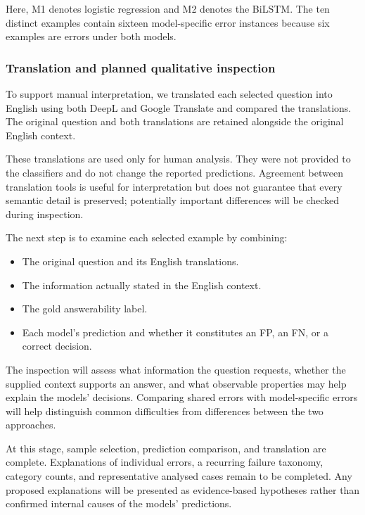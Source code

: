 \documentclass[11pt,a4paper]{article}
\begin{document}
Here, M1 denotes logistic regression and M2 denotes the BiLSTM.
The ten distinct examples contain sixteen model-specific error
instances because six examples are errors under both models.

\subsubsection{Translation and planned qualitative inspection}

To support manual interpretation, we translated each selected question
into English using both DeepL and Google Translate and compared the
translations. The original question and both translations are retained
alongside the original English context.

These translations are used only for human analysis. They were not
provided to the classifiers and do not change the reported predictions.
Agreement between translation tools is useful for interpretation but
does not guarantee that every semantic detail is preserved; potentially
important differences will be checked during inspection.

The next step is to examine each selected example by combining:
\begin{itemize}
    \item The original question and its English translations.
    \item The information actually stated in the English context.
    \item The gold answerability label.
    \item Each model's prediction and whether it constitutes an FP,
    an FN, or a correct decision.
\end{itemize}

The inspection will assess what information the question requests,
whether the supplied context supports an answer, and what observable
properties may help explain the models' decisions. Comparing shared
errors with model-specific errors will help distinguish common
difficulties from differences between the two approaches.

At this stage, sample selection, prediction comparison, and translation
are complete. Explanations of individual errors, a recurring failure
taxonomy, category counts, and representative analysed cases remain
to be completed. Any proposed explanations will be presented as
evidence-based hypotheses rather than confirmed internal causes of
the models' predictions.

\end{document}
